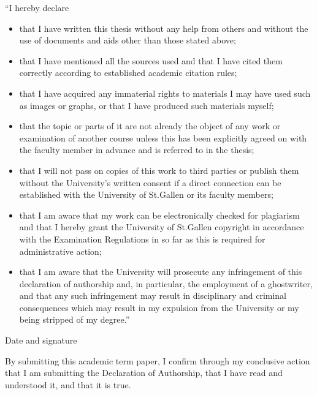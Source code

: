 \noindent
“I hereby declare

\begin{itemize}
    \item that I have written this thesis without any help from others and without the use of documents and aids other than those stated above;
    
    \item that I have mentioned all the sources used and that I have cited them correctly according to established academic citation rules;
    
    \item that I have acquired any immaterial rights to materials I may have used such as images or graphs, or that I have produced such materials myself;
    
    \item that the topic or parts of it are not already the object of any work or examination of another course unless this has been explicitly agreed on with the faculty member in advance and is referred to in the thesis;
    
    \item that I will not pass on copies of this work to third parties or publish them without the University’s written consent if a direct connection can be established with the University of St.Gallen or its faculty members;
    
    \item that I am aware that my work can be electronically checked for plagiarism and that I hereby grant the University of St.Gallen copyright in accordance with the Examination Regulations in so far as this is required for administrative action;
    
    \item that I am aware that the University will prosecute any infringement of this declaration of authorship and, in particular, the employment of a ghostwriter, and that any such infringement may result in disciplinary and criminal consequences which may result in my expulsion from the University or my being stripped of my degree.”
\end{itemize}

\vspace{0.5cm}

\noindent
Date and signature

\vspace{1cm}

\noindent
\dotfill

\noindent
By submitting this academic term paper, I confirm through my conclusive action that I am submitting the Declaration of Authorship, that I have read and understood it, and that it is true.